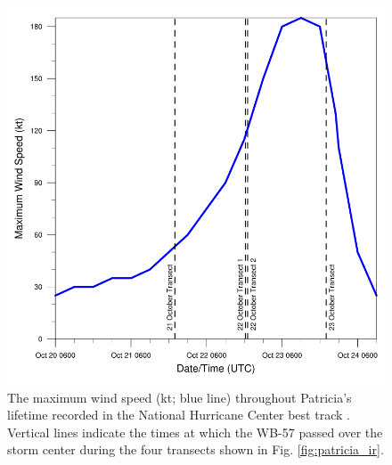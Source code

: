 \begin{figure}[ht]
\centerline{\includegraphics[width=39pc]{figures/fig02_patricia-intensity.png}}
\caption{The maximum wind speed (kt; blue line) throughout Patricia’s lifetime recorded in the National Hurricane Center best track \citep{Kimberlainetal2016}. Vertical lines indicate the times at which the WB-57 passed over the storm center during the four transects shown in Fig. \ref{fig:patricia_ir}.}
\label{fig:vmax}
\end{figure}

